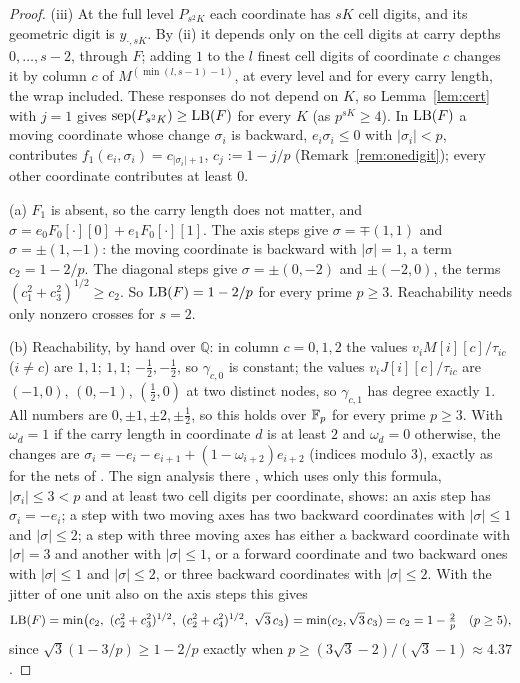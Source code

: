 \begin{proof}
(iii) At the full level $P_{s^2K}$ each coordinate has $sK$ cell digits, and its geometric digit is $y_{\cdot,sK}$. By (ii) it depends only on the cell digits at carry depths $0,\dots,s-2$, through $F$; adding $1$ to the $l$ finest cell digits of coordinate $c$ changes it by column $c$ of $M^{(\min(l,s-1)-1)}$, at every level and for every carry length, the wrap included. These responses do not depend on $K$, so Lemma~\ref{lem:cert} with $j=1$ gives $\operatorname{sep}(P_{s^2K})\ge\mathrm{LB}(F)$ for every $K$ (as $p^{sK}\ge4$). In $\mathrm{LB}(F)$ a moving coordinate whose change $\sigma_i$ is backward, $e_i\sigma_i\le0$ with $|\sigma_i|<p$, contributes $f_1(e_i,\sigma_i)=c_{|\sigma_i|+1}$, $c_j:=1-j/p$ (Remark~\ref{rem:onedigit}); every other coordinate contributes at least $0$.

(a) $F_1$ is absent, so the carry length does not matter, and $\sigma=e_0F_0[\cdot][0]+e_1F_0[\cdot][1]$. The axis steps give $\sigma=\mp(1,1)$ and $\sigma=\pm(1,-1)$: the moving coordinate is backward with $|\sigma|=1$, a term $c_2=1-2/p$. The diagonal steps give $\sigma=\pm(0,-2)$ and $\pm(-2,0)$, the terms $(c_1^2+c_3^2)^{1/2}\ge c_2$. So $\mathrm{LB}(F)=1-2/p$ for every prime $p\ge3$. Reachability needs only nonzero crosses for $s=2$.

(b) Reachability, by hand over $\mathbb{Q}$: in column $c=0,1,2$ the values $v_iM[i][c]/\tau_{ic}$ ($i\ne c$) are $1,1$; $1,1$; $-\frac12,-\frac12$, so $\gamma_{c,0}$ is constant; the values $v_iJ[i][c]/\tau_{ic}$ are $(-1,0)$, $(0,-1)$, $(\frac12,0)$ at two distinct nodes, so $\gamma_{c,1}$ has degree exactly $1$. All numbers are $0,\pm1,\pm2,\pm\frac12$, so this holds over $\mathbb{F}_p$ for every prime $p\ge3$. With $\omega_d=1$ if the carry length in coordinate $d$ is at least $2$ and $\omega_d=0$ otherwise, the changes are $\sigma_i=-e_i-e_{i+1}+(1-\omega_{i+2})e_{i+2}$ (indices modulo $3$), exactly as for the nets of \cite{Gru26geo}%
. The sign analysis there%
, which uses only this formula, $|\sigma_i|\le3<p$ and at least two cell digits per coordinate, shows: an axis step has $\sigma_i=-e_i$; a step with two moving axes has two backward coordinates with $|\sigma|\le1$ and $|\sigma|\le2$; a step with three moving axes has either a backward coordinate with $|\sigma|=3$ and another with $|\sigma|\le1$, or a forward coordinate and two backward ones with $|\sigma|\le1$ and $|\sigma|\le2$, or three backward coordinates with $|\sigma|\le2$. With the jitter of one unit also on the axis steps this gives
\[
\LB(F)=\min\bigl(c_2,\ (c_2^2+c_3^2)^{1/2},\ (c_2^2+c_4^2)^{1/2},\ \sqrt3\,c_3\bigr)=\min(c_2,\sqrt3\,c_3)=c_2=1-\tfrac2p\quad(p\ge5),
\]
since $\sqrt3(1-3/p)\ge1-2/p$ exactly when $p\ge(3\sqrt3-2)/(\sqrt3-1)\approx4.37$.


\end{proof}
